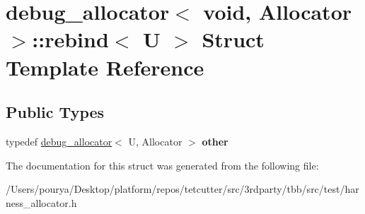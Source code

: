 \hypertarget{structdebug__allocator_3_01void_00_01Allocator_01_4_1_1rebind}{}\section{debug\+\_\+allocator$<$ void, Allocator $>$\+:\+:rebind$<$ U $>$ Struct Template Reference}
\label{structdebug__allocator_3_01void_00_01Allocator_01_4_1_1rebind}
\subsection*{Public Types}
\begin{DoxyCompactItemize}
\item 
\hypertarget{structdebug__allocator_3_01void_00_01Allocator_01_4_1_1rebind_aa5668ff4a81989220d24565ee1feb7d2}{}typedef \hyperlink{classdebug__allocator}{debug\+\_\+allocator}$<$ U, Allocator $>$ {\bfseries other}\label{structdebug__allocator_3_01void_00_01Allocator_01_4_1_1rebind_aa5668ff4a81989220d24565ee1feb7d2}

\end{DoxyCompactItemize}


The documentation for this struct was generated from the following file\+:\begin{DoxyCompactItemize}
\item 
/\+Users/pourya/\+Desktop/platform/repos/tetcutter/src/3rdparty/tbb/src/test/harness\+\_\+allocator.\+h\end{DoxyCompactItemize}
